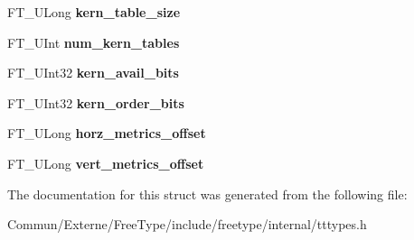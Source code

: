 \begin{DoxyCompactItemize}
\item 
F\+T\+\_\+\+U\+Long {\bfseries kern\+\_\+table\+\_\+size}\hypertarget{struct_t_t___face_rec___acfef0fabbe95af382fb0710edfe98887}{}\label{struct_t_t___face_rec___acfef0fabbe95af382fb0710edfe98887}

\item 
F\+T\+\_\+\+U\+Int {\bfseries num\+\_\+kern\+\_\+tables}\hypertarget{struct_t_t___face_rec___a9c5b27564d0c22e0ee6edd7b6dc675c0}{}\label{struct_t_t___face_rec___a9c5b27564d0c22e0ee6edd7b6dc675c0}

\item 
F\+T\+\_\+\+U\+Int32 {\bfseries kern\+\_\+avail\+\_\+bits}\hypertarget{struct_t_t___face_rec___a5f97232ee6773a57ef8734555cc960e1}{}\label{struct_t_t___face_rec___a5f97232ee6773a57ef8734555cc960e1}

\item 
F\+T\+\_\+\+U\+Int32 {\bfseries kern\+\_\+order\+\_\+bits}\hypertarget{struct_t_t___face_rec___a810b4e002ebbdfcb44005cb69b09a917}{}\label{struct_t_t___face_rec___a810b4e002ebbdfcb44005cb69b09a917}

\item 
F\+T\+\_\+\+U\+Long {\bfseries horz\+\_\+metrics\+\_\+offset}\hypertarget{struct_t_t___face_rec___a5ff62c77d90743e333ca8dfa7d382f22}{}\label{struct_t_t___face_rec___a5ff62c77d90743e333ca8dfa7d382f22}

\item 
F\+T\+\_\+\+U\+Long {\bfseries vert\+\_\+metrics\+\_\+offset}\hypertarget{struct_t_t___face_rec___a33baf2e26d533d82f06875361fd423d1}{}\label{struct_t_t___face_rec___a33baf2e26d533d82f06875361fd423d1}

\end{DoxyCompactItemize}


The documentation for this struct was generated from the following file\+:\begin{DoxyCompactItemize}
\item 
Commun/\+Externe/\+Free\+Type/include/freetype/internal/tttypes.\+h\end{DoxyCompactItemize}
